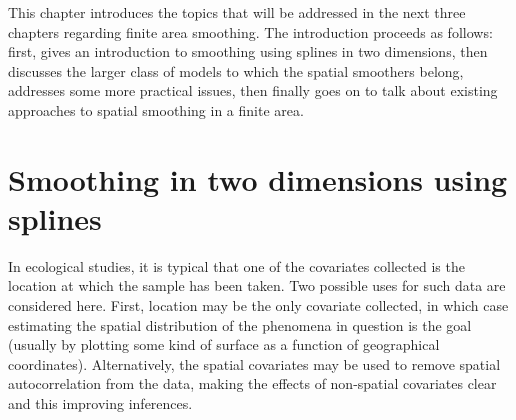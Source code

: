 \label{chap-intro}

This chapter introduces the topics that will be addressed in the next three chapters regarding finite area smoothing. The introduction proceeds as follows: first,  gives an introduction to smoothing using splines in two dimensions,  then discusses the larger class of models to which the spatial smoothers belong,  addresses some more practical issues, then finally  goes on to talk about existing approaches to spatial smoothing in a finite area.

\section{Smoothing in two dimensions using splines}
\label{intro-GAM}

In ecological studies, it is typical that one of the covariates collected is the location at which the sample has been taken. Two possible uses for such data are considered here. First, location may be the only covariate collected, in which case estimating the spatial distribution of the phenomena in question is the goal (usually by plotting some kind of surface as a function of geographical coordinates). Alternatively, the spatial covariates may be used to remove spatial autocorrelation from the data, making the effects of non-spatial covariates clear and this improving inferences.

